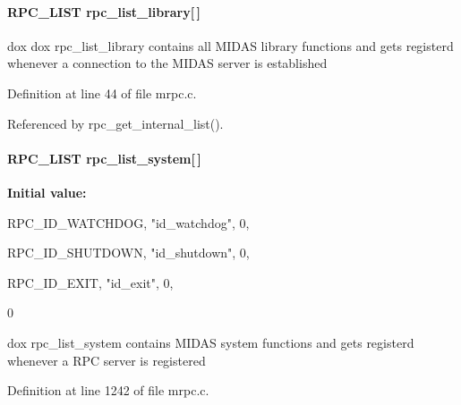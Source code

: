 \paragraph[{rpc\_\-list\_\-library}]{\setlength{\rightskip}{0pt plus 5cm}RPC\_\-LIST {\bf rpc\_\-list\_\-library}\mbox{[}$\,$\mbox{]}}\hfill\label{group__mrpcstructc_gac70e10137f9db5797fd787c326ade74a}
dox dox rpc\_\-list\_\-library contains all MIDAS library functions and gets registerd whenever a connection to the MIDAS server is established 

Definition at line 44 of file mrpc.c.

Referenced by rpc\_\-get\_\-internal\_\-list().
\paragraph[{rpc\_\-list\_\-system}]{\setlength{\rightskip}{0pt plus 5cm}RPC\_\-LIST {\bf rpc\_\-list\_\-system}\mbox{[}$\,$\mbox{]}}\hfill\label{group__mrpcstructc_ga3aedfec709ee3e22f1f9040dde0bd75b}
{\bfseries Initial value:}
\begin{DoxyCode}
 {

   
   {RPC_ID_WATCHDOG, "id_watchdog",
    {{0}}},

   {RPC_ID_SHUTDOWN, "id_shutdown",
    {{0}}},

   {RPC_ID_EXIT, "id_exit",
    {{0}}},

   {0}

}
\end{DoxyCode}
dox rpc\_\-list\_\-system contains MIDAS system functions and gets registerd whenever a RPC server is registered 

Definition at line 1242 of file mrpc.c.
